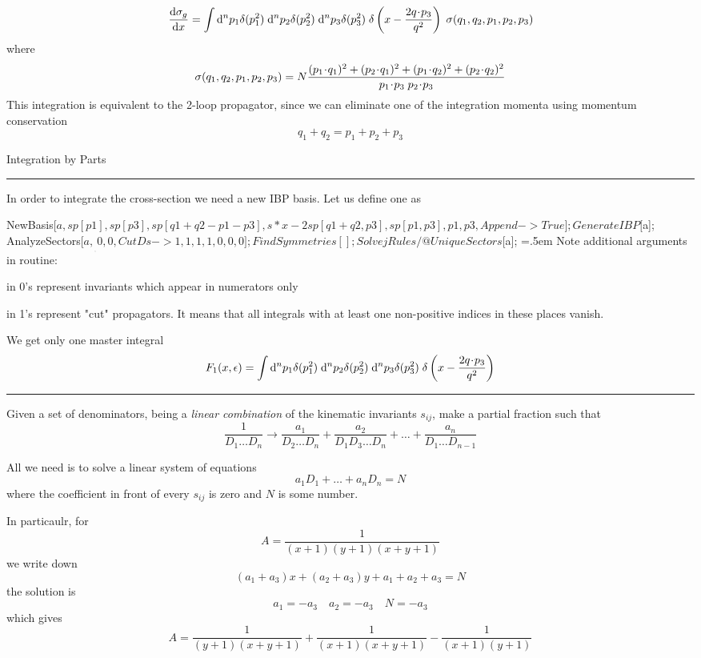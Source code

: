 \documentclass[11pt]{article}
\newcommand{\titleb}[2]{{\color{Blue}{\LARGE #1}\hfill{\Large #2}\vspace{-2mm}\par\rule{\textwidth}{1pt}\vs}}
\newcommand{\titlea}[1]{\titleb{#1}{}}
\newenvironment{codeblock}
 {\SaveVerbatim{cverb}}
 {\endSaveVerbatim
  \flushleft\fboxrule=0pt\fboxsep=.5em
  \colorbox{LightGray}{%
    \makebox[\dimexpr\linewidth-2\fboxsep][l]{\BUseVerbatim{cverb}}}
  \endflushleft}
\newcommand{\spr}[2]{#1\!\cdot\!#2}
\begin{document}
$$
\frac{\mathrm{d}\sigma_g}{\mathrm{d} x} = \int \mathrm{d}^n p_1 \delta(p_1^2) \; \mathrm{d}^n p_2 \delta(p_2^2) \; \mathrm{d}^n p_3 \delta(p_3^2) \; \delta\left(x-\frac{2 q\!\cdot\!p_3}{q^2}\right) \; \sigma(q_1,q_2,p_1,p_2,p_3)
$$
where
$$
\sigma(q_1,q_2,p_1,p_2,p_3)
=
N \frac{(\spr{p_1}{q_1})^2+(\spr{p_2}{q_1})^2+(\spr{p_1}{q_2})^2+(\spr{p_2}{q_2})^2}{\spr{p_1}{p_3}\x\spr{p_2}{p_3}}
$$
This integration is equivalent to the 2-loop propagator, since we can eliminate one of the integration momenta using momentum conservation
$$ q_1 + q_2 = p_1 + p_2 + p_3 $$
\newpage


\titleb{Example 2}{Integration by Parts}

In order to integrate the cross-section we need a new IBP basis. Let us define one as
\vs

\begin{codeblock}
NewBasis[$a,{sp[p1], sp[p3], sp[q1+q2-p1-p3], s*x-2sp[q1+q2,p3], sp[p1,p3]},
            {p1, p3}, Append -> True];

GenerateIBP[$a];
AnalyzeSectors[$a, {___,0,0}, CutDs -> {1,1,1,1,0,0,0}];
FindSymmetries[];

SolvejRules /@ UniqueSectors[$a];
\end{codeblock}
\vs
Note additional arguments in  routine:
\bi
  \item in  0's represent invariants which appear in numerators only
  \item in  1's represent "cut" propagators. It means that all integrals with at least one non-positive indices in these places vanish.
\ei

\vs
We get only one master integral
$$
F_1(x,\epsilon) = \int \mathrm{d}^n p_1 \delta(p_1^2) \; \mathrm{d}^n p_2 \delta(p_2^2) \; \mathrm{d}^n p_3 \delta(p_3^2) \; \delta\left(x-\frac{2 q\!\cdot\!p_3}{q^2}\right)
$$
\newpage


\titlea{IV. Partial Fractioning}
Given a set of denominators, being a {\em linear combination} of the kinematic invariants $s_{ij}$, make a partial fraction such that
$$
  \frac{1}{D_1\ldots D_n} \to \frac{a_1}{D_2 \ldots D_n} +  \frac{a_2}{D_1 D_3 \ldots D_n} + \ldots + \frac{a_n}{D_1 \ldots D_{n-1}}
$$

All we need is to solve a linear system of equations
$$ a_1 D_1 + \ldots + a_n D_n = N $$
where the coefficient in front of every $s_{ij}$ is zero and $N$ is some number.

\vs
In particaulr, for
$$
  A = \frac{1}{(x+1)(y+1)(x+y+1)}
$$
we write down
$$
  (a_1 + a_3) x + (a_2 + a_3) y + a_1 + a_2 + a_3 = N
$$
the solution is
$$
  a_1 = - a_3 \quad  a_2 = - a_3 \quad N = - a_3
$$
which gives
$$
  A = \frac{1}{(y+1)(x+y+1)} + \frac{1}{(x+1)(x+y+1)} - \frac{1}{(x+1)(y+1)}
$$
\newpage
\end{document}
